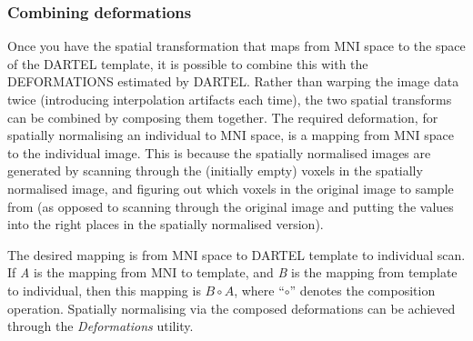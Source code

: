 \subsubsection{Combining deformations}
Once you have the spatial transformation that maps from MNI space to the space of the DARTEL template, it is possible to combine this with the DEFORMATIONS estimated by DARTEL.
Rather than warping the image data twice (introducing interpolation artifacts each time), the two spatial transforms can be combined by composing them together.
The required deformation, for spatially normalising an individual to MNI space, is a mapping from MNI space to the individual image.
This is because the spatially normalised images are generated by scanning through the (initially empty) voxels in the spatially normalised image, and figuring out which voxels in the original image to sample from (as opposed to scanning through the original image and putting the values into the right places in the spatially normalised version).

The desired mapping is from MNI space to DARTEL template to individual scan.
If \emph{A} is the mapping from MNI to template, and \emph{B} is the mapping from template to individual, then this mapping is $B \circ A$, where ``$\circ$'' denotes the composition operation.
Spatially normalising via the composed deformations can be achieved through the \emph{Deformations} utility. 

